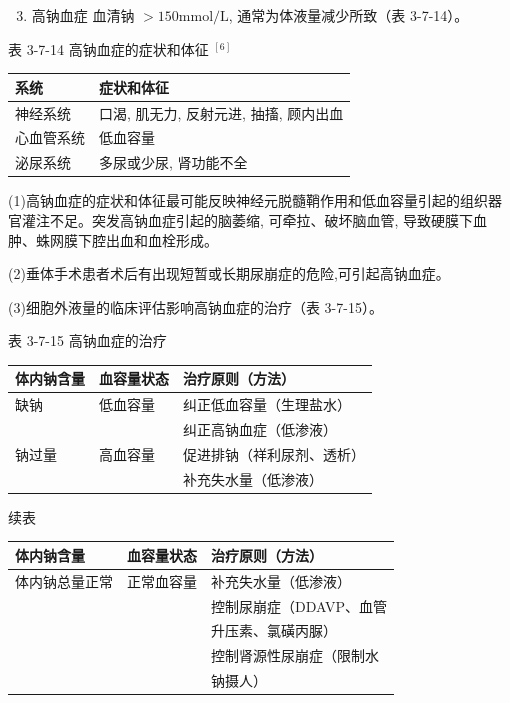 \documentclass[10pt]{article}
\begin{document}
\begin{enumerate}
  \setcounter{enumi}{2}
  \item 高钠血症 血清钠 $>150 \mathrm{mmol} / \mathrm{L}$, 通常为体液量减少所致（表 3-7-14）。
\end{enumerate}

表 3-7-14 高钠血症的症状和体征 ${ }^{[6]}$

\begin{center}
\begin{tabular}{ll}
\hline
系统 & 症状和体征 \\
\hline
神经系统 & 口渴, 肌无力, 反射元进, 抽搐, 顾内出血 \\
心血管系统 & 低血容量 \\
泌尿系统 & 多尿或少尿, 肾功能不全 \\
\hline
\end{tabular}
\end{center}

(1)高钠血症的症状和体征最可能反映神经元脱髓鞘作用和低血容量引起的组织器官灌注不足。突发高钠血症引起的脑萎缩, 可牵拉、破坏脑血管, 导致硬膜下血肿、蛛网膜下腔出血和血栓形成。

(2)垂体手术患者术后有出现短暂或长期尿崩症的危险,可引起高钠血症。

(3)细胞外液量的临床评估影响高钠血症的治疗（表 3-7-15）。

表 3-7-15 高钠血症的治疗

\begin{center}
\begin{tabular}{lll}
\hline
体内钠含量 & 血容量状态 & 治疗原则（方法） \\
\hline
缺钠 & 低血容量 & 纠正低血容量（生理盐水） \\
 &  & 纠正高钠血症（低渗液） \\
钠过量 & 高血容量 & 促进排钠（祥利尿剂、透析） \\
 &  & 补充失水量（低渗液） \\
\hline
\end{tabular}
\end{center}

续表

\begin{center}
\begin{tabular}{lll}
\hline
体内钠含量 & 血容量状态 & 治疗原则（方法） \\
\hline
体内钠总量正常 & 正常血容量 & 补充失水量（低渗液） \\
 &  & 控制尿崩症（DDAVP、血管 \\
 &  & 升压素、氯磺丙脲） \\
 &  & 控制肾源性尿崩症（限制水 \\
 &  & 钠摄人） \\
\hline
\end{tabular}
\end{center}
\end{document}
